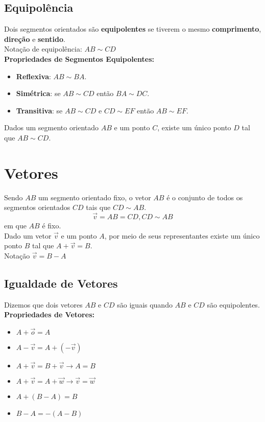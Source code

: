 \documentclass[ ]{article}
\begin{document}
		\subsection{Equipolência}
			Dois segmentos orientados são \textbf{equipolentes} se tiverem o mesmo \textbf{comprimento}, \textbf{direção} e \textbf{sentido}.\\
			Notação de equipolência: $AB \sim CD$\\
			\textbf{Propriedades de Segmentos Equipolentes:}
			\begin{itemize}
				\item \textbf{Reflexiva}: $AB \sim BA$.
				\item \textbf{Simétrica}: se $AB \sim CD$ então $BA \sim DC$.
				\item \textbf{Transitiva}: se $AB \sim CD$ e $CD \sim EF$ então $AB \sim EF$.
			\end{itemize}
			Dados um segmento orientado $AB$ e um ponto $C$, existe um único ponto $D$ tal que $AB \sim CD$.
			
	\section{Vetores}
		Sendo $AB$ um segmento orientado fixo, o vetor $AB$ é o conjunto de todos os segmentos orientados $CD$ tais que $CD \sim AB$.
		$$\overrightarrow{v} = AB = {CD,CD \sim AB}$$
		em que $AB$ é fixo.\\
		Dado um vetor $\overrightarrow{v}$ e um ponto $A$, por meio de seus representantes existe um único ponto $B$ tal que $A+ \overrightarrow{v} = B$.\\
		Notação $\overrightarrow{v} = B-A$
		\subsection{Igualdade de Vetores}
			Dizemos que dois vetores $AB$ e $CD$ são iguais quando $AB$ e $CD$ são equipolentes.\\
			\textbf{Propriedades de Vetores:}
			\begin{itemize}
				\item $A + \overrightarrow{o} = A$
				\item $A- \overrightarrow{v} = A + (-\overrightarrow{v})$
				\item $A+ \overrightarrow{v} = B + \overrightarrow{v} \to A=B$
				\item $A + \overrightarrow{v} = A + \overrightarrow{w} \to \overrightarrow{v} = \overrightarrow{w}$
				\item $A+(B-A)=B$
				\item $B-A = -(A-B)$
			\end{itemize}
\end{document}
